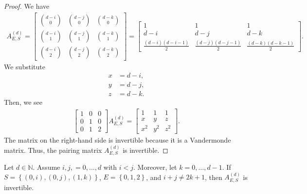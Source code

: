 \begin{proof}
    We have 
    \begin{align*}
        A^{(d)}_{E,S} = \begin{bmatrix}
            \binom{d-i}{0} & \binom{d-j}{0} & \binom{d-k}{0} \\
            \binom{d-i}{1} & \binom{d-j}{1} & \binom{d-k}{1} \\
            \binom{d-i}{2} & \binom{d-j}{2} & \binom{d-k}{2}
        \end{bmatrix} = \begin{bmatrix}
            1 & 1 & 1 \\
            d-i & d-j & d-k \\
            \frac{(d-i)(d-i-1)}{2} & \frac{(d-j)(d-j-1)}{2} & \frac{(d-k)(d-k-1)}{2}
        \end{bmatrix}.
    \end{align*}
    We substitute 
    \begin{align*}
        x &= d - i, \\
        y &= d - j, \\
        z &= d - k.
    \end{align*}
    Then, we see
    \begin{align*}
        \begin{bmatrix}
            1 & 0 & 0 \\
            0 & 1 & 0 \\
            0 & 1 & 2
        \end{bmatrix}A^{(d)}_{E,S} = \begin{bmatrix}
            1 & 1 & 1 \\
            x & y & z \\
            x^2 & y^2 & z^2
        \end{bmatrix}.
    \end{align*}
    The matrix on the right-hand side is invertible because it is a Vandermonde matrix. Thus, the pairing matrix \( A^{(d)}_{E,S} \) is invertible.
\end{proof}

\begin{proposition}\label{prop:impossible-support-2324223423123123}
    Let \( d \in \mathbb{N} \). Assume \( i,j,=0, \dots, d \) with \( i < j \). Moreover, let \( k=0, \dots, d-1 \). If \( S = \left\{ (0,i), (0,j), (1,k) \right\} \), \( E = \left\{ 0,1,2 \right\} \), and \( i+j \neq 2k + 1 \), then \( A^{(d)}_{E,S} \) is invertible.
\end{proposition}

